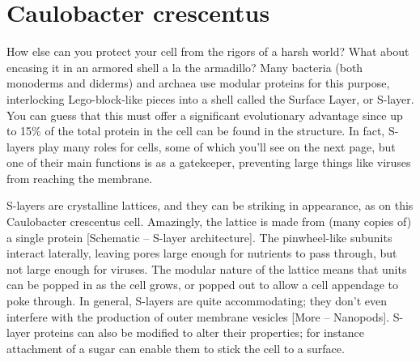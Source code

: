 \documentclass[]{book}
\begin{document}
\section{Caulobacter crescentus}\label{caulobacter-crescentus}

How else can you protect your cell from the rigors of a harsh world?
What about encasing it in an armored shell a la the armadillo? Many
bacteria (both monoderms and diderms) and archaea use modular proteins
for this purpose, interlocking Lego-block-like pieces into a shell
called the Surface Layer, or S-layer. You can guess that this must offer
a significant evolutionary advantage since up to 15\% of the total
protein in the cell can be found in the structure. In fact, S-layers
play many roles for cells, some of which you'll see on the next page,
but one of their main functions is as a gatekeeper, preventing large
things like viruses from reaching the membrane.

S-layers are crystalline lattices, and they can be striking in
appearance, as on this Caulobacter crescentus cell. Amazingly, the
lattice is made from (many copies of) a single protein {[}Schematic --
S-layer architecture{]}. The pinwheel-like subunits interact laterally,
leaving pores large enough for nutrients to pass through, but not large
enough for viruses. The modular nature of the lattice means that units
can be popped in as the cell grows, or popped out to allow a cell
appendage to poke through. In general, S-layers are quite accommodating;
they don't even interfere with the production of outer membrane vesicles
{[}More -- Nanopods{]}. S-layer proteins can also be modified to alter
their properties; for instance attachment of a sugar can enable them to
stick the cell to a surface.
\end{document}
